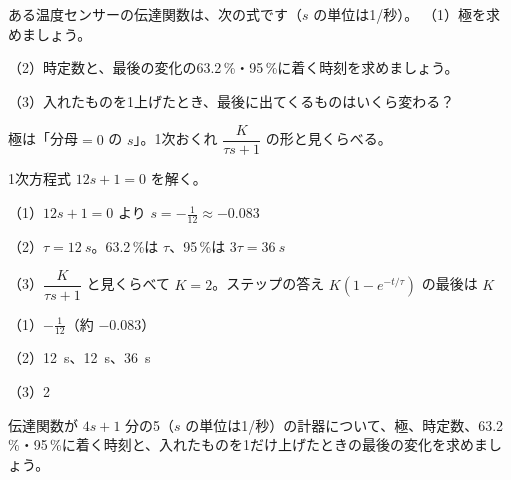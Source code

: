 \begin{reidai}[1次おくれの温度センサー]
ある温度センサーの伝達関数は、次の式です（$s$ の単位は1/秒）。
（1）極を求めましょう。\par
（2）時定数と、最後の変化の63.2\,\%・95\,\%に着く時刻を求めましょう。\par
（3）入れたものを1上げたとき、最後に出てくるものはいくら変わる？\par
\kangaekata {}\par
{}\enspace 極は「分母$=0$ の $s$」。1次おくれ $\dfrac{K}{\tau s+1}$ の形と見くらべる。\par
{}\enspace 1次方程式 $12s+1=0$ を解く。\par
\shiki\kixjs{}\zw{} （1）$12s+1=0$ より $s=-\frac{1}{12}\approx-0.083$\par
\kixja （2）$\tau=\qty{12}{s}$。63.2\,\%は $\tau$、95\,\%は $3\tau=\qty{36}{s}$\par
\kixja （3）$\dfrac{K}{\tau s+1}$ と見くらべて $K=2$。ステップの答え $K(1-e^{-t/\tau})$ の最後は $K$\par
\kotae\kixjs{}\zw{} （1）$-\frac{1}{12}$（約 $-0.083$）\par
\kixja （2）\qty{12}{s}、\qty{12}{s}、\qty{36}{s}\par
\kixja （3）2
\end{reidai}

\begin{jibun}
伝達関数が $4s+1$ 分の5（$s$ の単位は1/秒）の計器について、極、時定数、63.2\,\%・95\,\%に着く時刻と、入れたものを1だけ上げたときの最後の変化を求めましょう。
\end{jibun}

